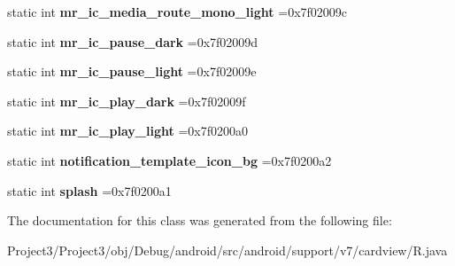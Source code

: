 \begin{DoxyCompactItemize}
static int {\bfseries mr\+\_\+ic\+\_\+media\+\_\+route\+\_\+mono\+\_\+light} =0x7f02009c
\item 
\mbox{\label{classandroid_1_1support_1_1v7_1_1cardview_1_1R_1_1drawable_a91276a4cb037732fc38116846e1a4a03}} 
static int {\bfseries mr\+\_\+ic\+\_\+pause\+\_\+dark} =0x7f02009d
\item 
\mbox{\label{classandroid_1_1support_1_1v7_1_1cardview_1_1R_1_1drawable_a689e29d949666134584f5d605cb66646}} 
static int {\bfseries mr\+\_\+ic\+\_\+pause\+\_\+light} =0x7f02009e
\item 
\mbox{\label{classandroid_1_1support_1_1v7_1_1cardview_1_1R_1_1drawable_a9c4d81645c0485dc7e53777f23852fd1}} 
static int {\bfseries mr\+\_\+ic\+\_\+play\+\_\+dark} =0x7f02009f
\item 
\mbox{\label{classandroid_1_1support_1_1v7_1_1cardview_1_1R_1_1drawable_a5bccc1e8388238ee8f73050fef320c82}} 
static int {\bfseries mr\+\_\+ic\+\_\+play\+\_\+light} =0x7f0200a0
\item 
\mbox{\label{classandroid_1_1support_1_1v7_1_1cardview_1_1R_1_1drawable_ad2899bee66af380740da37b53a9ed08c}} 
static int {\bfseries notification\+\_\+template\+\_\+icon\+\_\+bg} =0x7f0200a2
\item 
\mbox{\label{classandroid_1_1support_1_1v7_1_1cardview_1_1R_1_1drawable_a9c80d5a0b91a8c7fb5924b81b1c7b9b5}} 
static int {\bfseries splash} =0x7f0200a1
\end{DoxyCompactItemize}


The documentation for this class was generated from the following file\+:\begin{DoxyCompactItemize}
\item 
Project3/\+Project3/obj/\+Debug/android/src/android/support/v7/cardview/R.\+java\end{DoxyCompactItemize}
